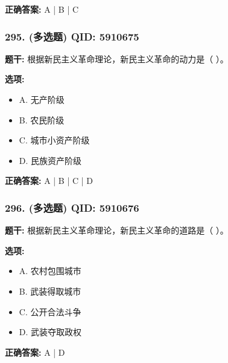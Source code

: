 \documentclass[12pt,UTF8]{ctexart}
\begin{document}
\textbf{正确答案:}
A | B | C

\vspace{0.3em}\hrulefill\vspace{0.7em}

\subsubsection*{295. (多选题) \small QID: 5910675}

\textbf{题干:}
根据新民主义革命理论，新民主义革命的动力是（ ）。

\textbf{选项:}
\begin{itemize}[leftmargin=*]

  \item A. 无产阶级

  \item B. 农民阶级

  \item C. 城市小资产阶级

  \item D. 民族资产阶级

\end{itemize}

\textbf{正确答案:}
A | B | C | D

\vspace{0.3em}\hrulefill\vspace{0.7em}

\subsubsection*{296. (多选题) \small QID: 5910676}

\textbf{题干:}
根据新民主义革命理论，新民主义革命的道路是（ ）。

\textbf{选项:}
\begin{itemize}[leftmargin=*]

  \item A. 农村包围城市

  \item B. 武装得取城市

  \item C. 公开合法斗争

  \item D. 武装夺取政权

\end{itemize}

\textbf{正确答案:}
A | D

\vspace{0.3em}\hrulefill\vspace{0.7em}
\end{document}
